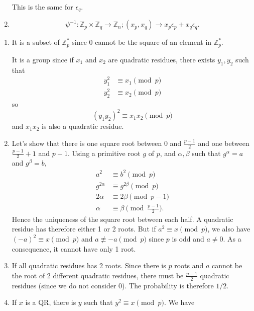 \begin{solution}
\begin{enumerate}
        This is the same for $\epsilon_q$.
      \item
        \[ \psi^{-1} : \mathbb{Z}_p \times \mathbb{Z}_q \to \mathbb{Z}_n; (x_p, x_q) \to x_p\epsilon_p + x_q\epsilon_q. \]
    \end{enumerate}
\end{solution}

\begin{solution}
  \begin{enumerate}
    \item
      It is a subset of $\mathbb{Z}_p^*$ since $0$
      cannot be the square of an element in $\mathbb{Z}_p^*$.

      It is a group since if $x_1$ and $x_2$ are quadratic residues,
      there exists $y_1,y_2$ such that
      \begin{align*}
        y_1^2 & \equiv x_1 \pmod{p}\\
        y_2^2 & \equiv x_2 \pmod{p}
      \end{align*}
      so
      \[ (y_1y_2)^2 \equiv x_1x_2 \pmod{p} \]
      and $x_1x_2$ is also a quadratic residue.
    \item
      Let's show that there is one square root between $0$ and $\frac{p-1}{2}$ and one between $\frac{p-1}{2}+1$ and $p-1$.
      Using a primitive root $g$ of $p$, and $\alpha,\beta$ such that $g^\alpha = a$ and $g^\beta = b$,
      \begin{align*}
        a^2 & \equiv b^2 \pmod{p}\\
        g^{2\alpha} & \equiv g^{2\beta} \pmod{p}\\
        2\alpha & \equiv 2\beta \pmod{p-1}\\
        \alpha & \equiv \beta \pmod{\frac{p-1}{2}}.
      \end{align*}
      Hence the uniqueness of the square root between each half.
      A quadratic residue has therefore either 1 or 2 roots.
      But if $a^2 \equiv x \pmod{p}$, we also have $(-a)^2 \equiv x \pmod{p}$ and $a \not\equiv -a \pmod{p}$ since $p$ is odd and $a \neq 0$.
      As a consequence, it cannot have only 1 root.
    \item
      If all quadratic residues has 2 roots.
      Since there is $p$ roots and $a$ cannot be the root of 2 different quadratic residues,
      there must be $\frac{p-1}{2}$ quadratic residues (since we do not consider 0).
      The probability is therefore $1/2$.
    \item
      If $x$ is a QR, there is $y$ such that $y^2 \equiv x \pmod{p}$.
      We have

\end{enumerate}
\end{solution}
